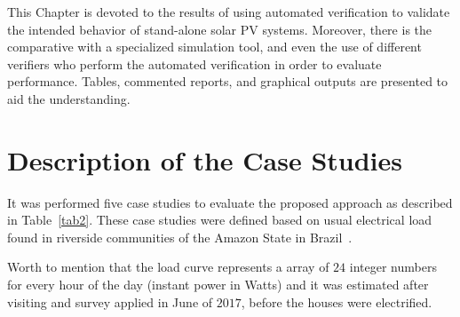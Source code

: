 This Chapter is devoted to the results of using automated verification to validate the intended behavior of stand-alone solar PV systems. Moreover, there is the comparative with a specialized simulation tool, and even the use of different verifiers who perform the automated verification in order to evaluate performance. Tables, commented reports, and graphical outputs are presented to aid the understanding.

\section{Description of the Case Studies}

It was performed five case studies to evaluate the proposed approach as described in Table~\ref{tab2}. %
These case studies were defined based on usual electrical load found in riverside communities of the Amazon State in Brazil~\cite{abs-1811-09438, Agrener2013}.

Worth to mention that the load curve represents a array of $24$ integer numbers for every hour of the day (instant power in Watts) and it was estimated after visiting and survey applied in June of $2017$, before the houses were electrified.

